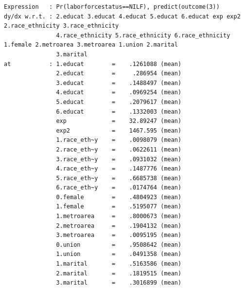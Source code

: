 \documentclass[
]{book}
\begin{document}
\begin{verbatim}
Expression   : Pr(laborforcestatus==NILF), predict(outcome(3))
dy/dx w.r.t. : 2.educat 3.educat 4.educat 5.educat 6.educat exp exp2 2.race_ethnicity 3.race_ethnicity
               4.race_ethnicity 5.race_ethnicity 6.race_ethnicity 1.female 2.metroarea 3.metroarea 1.union 2.marital
               3.marital
at           : 1.educat        =    .1261088 (mean)
               2.educat        =     .286954 (mean)
               3.educat        =    .1488497 (mean)
               4.educat        =    .0969254 (mean)
               5.educat        =    .2079617 (mean)
               6.educat        =    .1332003 (mean)
               exp             =    32.89247 (mean)
               exp2            =    1467.595 (mean)
               1.race_eth~y    =    .0098079 (mean)
               2.race_eth~y    =    .0622611 (mean)
               3.race_eth~y    =    .0931032 (mean)
               4.race_eth~y    =    .1487776 (mean)
               5.race_eth~y    =    .6685738 (mean)
               6.race_eth~y    =    .0174764 (mean)
               0.female        =    .4804923 (mean)
               1.female        =    .5195077 (mean)
               1.metroarea     =    .8000673 (mean)
               2.metroarea     =    .1904132 (mean)
               3.metroarea     =    .0095195 (mean)
               0.union         =    .9508642 (mean)
               1.union         =    .0491358 (mean)
               1.marital       =    .5163586 (mean)
               2.marital       =    .1819515 (mean)
               3.marital       =    .3016899 (mean)


\end{verbatim}
\end{document}
